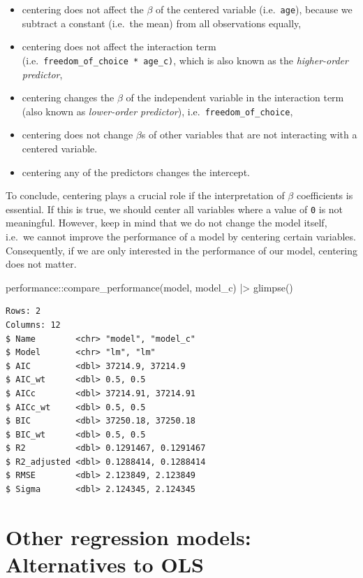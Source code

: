 \documentclass[
  letterpaper,
  DIV=11,
  numbers=noendperiod]{scrreprt}
\newenvironment{Shaded}{\begin{snugshade}}{\end{snugshade}}
\newcommand{\FunctionTok}[1]{\textcolor[rgb]{0.28,0.35,0.67}{#1}}
\newcommand{\NormalTok}[1]{\textcolor[rgb]{0.00,0.23,0.31}{#1}}
\newcommand{\SpecialCharTok}[1]{\textcolor[rgb]{0.37,0.37,0.37}{#1}}
\begin{document}
\begin{itemize}
\item
  centering does not affect the \(\beta\) of the centered variable
  (i.e.~\texttt{age}), because we subtract a constant (i.e.~the mean)
  from all observations equally,
\item
  centering does not affect the interaction term
  (i.e.~\texttt{freedom\_of\_choice\ *\ age\_c)}, which is also known as
  the \emph{higher-order predictor},
\item
  centering changes the \(\beta\) of the independent variable in the
  interaction term (also known as \emph{lower-order predictor}),
  i.e.~\texttt{freedom\_of\_choice},
\item
  centering does not change \(\beta\)s of other variables that are not
  interacting with a centered variable.
\item
  centering any of the predictors changes the intercept.
\end{itemize}

To conclude, centering plays a crucial role if the interpretation of
\(\beta\) coefficients is essential. If this is true, we should center
all variables where a value of \texttt{0} is not meaningful. However,
keep in mind that we do not change the model itself, i.e.~we cannot
improve the performance of a model by centering certain variables.
Consequently, if we are only interested in the performance of our model,
centering does not matter.

\begin{Shaded}
\begin{Highlighting}[]
\NormalTok{performance}\SpecialCharTok{::}\FunctionTok{compare\_performance}\NormalTok{(model, model\_c) }\SpecialCharTok{|\textgreater{}}
  \FunctionTok{glimpse}\NormalTok{()}
\end{Highlighting}
\end{Shaded}

\begin{verbatim}
Rows: 2
Columns: 12
$ Name        <chr> "model", "model_c"
$ Model       <chr> "lm", "lm"
$ AIC         <dbl> 37214.9, 37214.9
$ AIC_wt      <dbl> 0.5, 0.5
$ AICc        <dbl> 37214.91, 37214.91
$ AICc_wt     <dbl> 0.5, 0.5
$ BIC         <dbl> 37250.18, 37250.18
$ BIC_wt      <dbl> 0.5, 0.5
$ R2          <dbl> 0.1291467, 0.1291467
$ R2_adjusted <dbl> 0.1288414, 0.1288414
$ RMSE        <dbl> 2.123849, 2.123849
$ Sigma       <dbl> 2.124345, 2.124345
\end{verbatim}

\section{Other regression models: Alternatives to
OLS}\label{sec-ols-alternatives}
\end{document}
